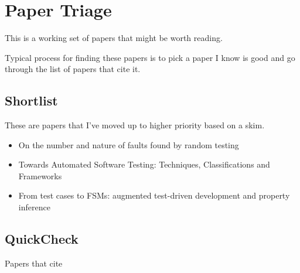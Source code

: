 \chapter{Paper Triage}

This is a working set of papers that might be worth reading.

Typical process for finding these papers is to pick a paper I know is good and go through the list of papers that cite it.

\section{Shortlist}

These are papers that I've moved up to higher priority based on a skim.

\begin{itemize}
\item On the number and nature of faults found by random testing\cite{DBLP:journals/stvr/CiupaPOLM11}
\item Towards Automated Software Testing: Techniques, Classifications and Frameworks\cite{torkar2006towards}
\item From test cases to FSMs: augmented test-driven development and property inference\cite{DBLP:conf/erlang/ArtsT10}
\end{itemize}

\section{QuickCheck}

Papers that cite~\cite{DBLP:conf/icfp/ClaessenH00} 

